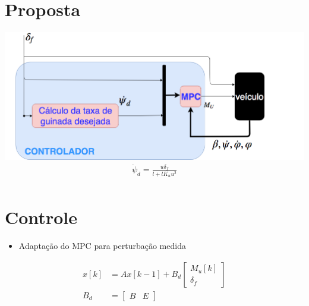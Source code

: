 \documentclass{beamer}
\begin{document}
\section{Proposta}%
  \begin{frame}[t]%
	\includegraphics[width=1\paperwidth,
	height=0.5\textwidth]{BlockDiagram.png}%
	\begin{equation*}
    
    \begin{split}
    	{\dot\psi}_d = \frac{u\delta_f}{l+lK_uu^2} \\
    \end{split}
    \end{equation*}
  \end{frame}%
  

\section{Controle}%

  \begin{frame}[t]%
   	\begin{itemize}
		\item Adaptação do MPC para perturbação medida
	\end{itemize}
     
     \begin{equation*}
         \begin{split}
			x[k] &= Ax[k-1] +  B_d \begin{bmatrix} M_u[k] \\ \delta_f \end{bmatrix}\\
			B_d &= 
			\begin{bmatrix}
				B & E
			\end{bmatrix} \\
         \end{split}
     \end{equation*}
     
     \end{frame}  
     
\end{document}
